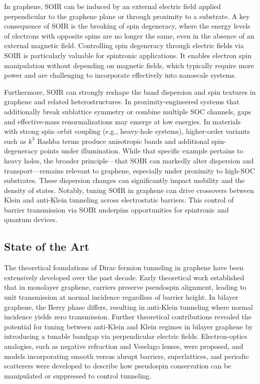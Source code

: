 In graphene, SOIR can be induced by an external electric field applied perpendicular to the graphene plane or through proximity to a substrate\cite{ShcherbakovSciAdv2021}.
A key consequence of SOIR is the breaking of spin degeneracy, where the energy levels of electrons with opposite spins are no longer the same, even in the absence of an external magnetic field\cite{DelkhoshPhysE2015}.
Controlling spin degeneracy through electric fields via SOIR is particularly valuable for spintronic applications.
It enables electron spin manipulation without depending on magnetic fields, which typically require more power and are challenging to incorporate effectively into nanoscale systems.


Furthermore, SOIR can strongly reshape the band dispersion and spin textures in graphene and related heterostructures\cite{WangPhysRevX2016}.
In proximity-engineered systems that additionally break sublattice symmetry or combine multiple SOC channels, gaps and effective-mass renormalizations may emerge at low energies\cite{WangPhysRevX2016, AvsarNatCommun2014}.
In materials with strong spin–orbit coupling (e.g., heavy-hole systems), higher-order variants such as $k^3$ Rashba terms produce anisotropic bands and additional spin-degeneracy points under illumination\cite{DellAnnaJPhysCondMatt2018, AvishaiPhysRevB2021}.
While that specific example pertains to heavy holes, the broader principle—that SOIR can markedly alter dispersion and transport—remains relevant to graphene, especially under proximity to high-SOC substrates\cite{GindikinPhysRevB2025}.
These dispersion changes can significantly impact mobility and the density of states.
Notably, tuning SOIR in graphene can drive crossovers between Klein and anti-Klein tunneling across electrostatic barriers\cite{DellAnnaJPhysCondMatt2018}.
This control of barrier transmission via SOIR underpins opportunities for spintronic and quantum devices\cite{YaoMater2024}.

\subsection{State of the Art}\label{subsec:state-of-the-art}

The theoretical foundations of Dirac fermion tunneling in graphene have been extensively developed over the past decade.
Early theoretical work established that in monolayer graphene, carriers preserve pseudospin alignment, leading to unit transmission at normal incidence regardless of barrier height\cite{Chen2016}.
In bilayer graphene, the Berry phase differs, resulting in anti-Klein tunneling where normal incidence yields zero transmission\cite{Du2018}.
Further theoretical contributions revealed the potential for tuning between anti-Klein and Klein regimes in bilayer graphene by introducing a tunable bandgap via perpendicular electric fields\cite{Du2018}.
Electron-optics analogies, such as negative refraction and Veselago lenses, were proposed, and models incorporating smooth versus abrupt barriers, superlattices, and periodic scatterers were developed to describe how pseudospin conservation can be manipulated or suppressed to control tunneling\cite{Walls2015,An2020}.

